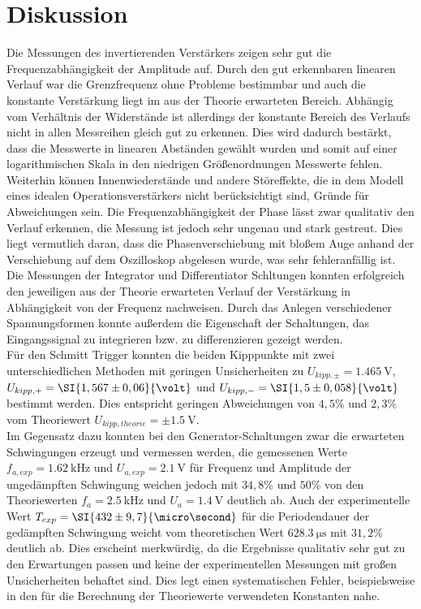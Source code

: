 \newpage
\section{Diskussion}
\label{sec:Diskussion}
Die Messungen des invertierenden Verstärkers zeigen sehr gut die Frequenzabhängigkeit der Amplitude auf. Durch den gut erkennbaren linearen Verlauf war die Grenzfrequenz ohne Probleme bestimmbar und auch die konstante Verstärkung liegt im aus der Theorie erwarteten Bereich. Abhängig vom Verhältnis der Widerstände ist allerdings der konstante Bereich des Verlaufs nicht in allen Messreihen gleich gut zu erkennen. Dies wird dadurch bestärkt, dass die Messwerte in linearen Abständen gewählt wurden und somit auf einer logarithmischen Skala in den niedrigen Größenordnungen Messwerte fehlen. Weiterhin können Innenwiederstände und andere Störeffekte, die in dem Modell eines idealen Operationsverstärkers nicht berücksichtigt sind, Gründe für Abweichungen sein. Die Frequenzabhängigkeit der Phase lässt zwar qualitativ den Verlauf erkennen, die Messung ist jedoch sehr ungenau und stark gestreut. Dies liegt vermutlich daran, dass die Phasenverschiebung mit bloßem Auge anhand der Verschiebung auf dem Oszilloskop abgelesen wurde, was sehr fehleranfällig ist. \\
Die Messungen der Integrator und Differentiator Schltungen konnten erfolgreich den jeweiligen aus der Theorie erwarteten Verlauf der Verstärkung in Abhängigkeit von der Frequenz nachweisen. Durch das Anlegen verschiedener Spannungsformen konnte außerdem die Eigenschaft der Schaltungen, das Eingangssignal zu integrieren bzw. zu differenzieren gezeigt werden.\\
Für den Schmitt Trigger konnten die beiden Kipppunkte mit zwei unterschiedlichen Methoden mit geringen Unsicherheiten zu $U_{kipp,\pm}=\SI{1,465}{\volt}$, $U_{kipp,+}=\SI{1,567\pm0,06}{\volt}$ und $U_{kipp,-}=\SI{1,5\pm0,058}{\volt}$ bestimmt werden. Dies entspricht geringen Abweichungen von  $4,5\%$ und $2,3\%$ vom Theoriewert $U_{kipp,theorie}=\pm\SI{1,5}{\volt}$. \\
Im Gegensatz dazu konnten bei den Generator-Schaltungen zwar die erwarteten Schwingungen erzeugt und vermessen werden, die gemessenen Werte $f_{a,exp}=\SI{1,62}{\kilo\hertz}$ und $U_{a,exp}=\SI{2,1}{\volt}$ für Frequenz und Amplitude der ungedämpften Schwingung weichen jedoch mit $34,8\%$ und $50\%$ von den Theoriewerten $f_a=\SI{2,5}{\kilo\hertz}$ und $U_a=\SI{1,4}{\volt}$ deutlich ab. Auch der experimentelle Wert $T_{exp}=\SI{432\pm9,7}{\micro\second}$ für die Periodendauer der gedämpften Schwingung weicht vom theoretischen Wert $\SI{628,3}{\micro\second}$ mit $31,2\%$ deutlich ab. Dies erscheint merkwürdig, da die Ergebnisse qualitativ sehr gut zu den Erwartungen passen und keine der experimentellen Messungen mit großen Unsicherheiten behaftet sind. Dies legt einen systematischen Fehler, beispielsweise in den für die Berechnung der Theoriewerte verwendeten Konstanten nahe.
